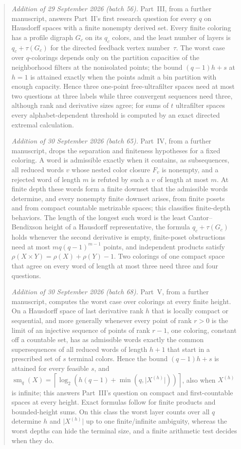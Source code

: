 \documentclass[11pt,letterpaper]{article}
\numberwithin{equation}{section}
\theoremstyle{definition}
\theoremstyle{remark}
\theoremstyle{definition}
\newcommand{\ceil}[1]{\left\lceil#1\right\rceil}
\newcommand{\smq}{\operatorname{sm}_{q}}
\begin{document}
\begin{abstract}
\emph{Addition of 29 September 2026 (batch 56).} Part~III, from a further
manuscript, answers Part~II's first research question for every $q$ on
Hausdorff spaces with a finite nonempty derived set. Every finite coloring
has a profile digraph $G_c$ on its $q_c$ colors, and the least number of
layers is $q_c+\tau(G_c)$ for the directed feedback vertex number~$\tau$. The
worst case over $q$-colorings depends only on the partition capacities of the
neighborhood filters at the nonisolated points; the bound $(q-1)h+s$ at $h=1$
is attained exactly when the points admit a bin partition with enough
capacity. Hence three one-point free-ultrafilter spaces need at most two
questions at three labels while three convergent sequences need three,
although rank and derivative sizes agree; for sums of $t$ ultrafilter spaces
every alphabet-dependent threshold is computed by an exact directed extremal
calculation.

\emph{Addition of 30 September 2026 (batch 65).} Part~IV, from a further
manuscript, drops the separation and finiteness hypotheses for a fixed
coloring. A word is admissible exactly when it contains, as subsequences, all
reduced words $v$ whose nested color closure $F_v$ is nonempty, and a rejected
word of length $m$ is refuted by such a $v$ of length at most $m$. At finite
depth these words form a finite downset that the admissible words determine,
and every nonempty finite downset arises, from finite posets and from compact
countable metrizable spaces; this classifies finite-depth behaviors. The
length of the longest such word is the least Cantor--Bendixson height of a
Hausdorff representative, the formula $q_c+\tau(G_c)$ holds whenever the second
derivative is empty, finite-poset obstructions need at most $mq(q-1)^{m-1}$
points, and independent products satisfy
$\rho(X\times Y)=\rho(X)+\rho(Y)-1$. Two colorings of one compact space that
agree on every word of length at most three need three and four questions.

\emph{Addition of 30 September 2026 (batch 68).} Part~V, from a further
manuscript, computes the worst case over colorings at every finite height.
On a Hausdorff space of last derivative rank $h$ that is locally compact or
sequential, and more generally whenever every point of rank $r>0$ is the
limit of an injective sequence of points of rank $r-1$, one coloring,
constant off a countable set, has as admissible words exactly the common
supersequences of all reduced words of length $h+1$ that start in a
prescribed set of $s$ terminal colors. Hence the bound $(q-1)h+s$ is
attained for every feasible $s$, and
$\smq(X)=\ceil{\log_2(h(q-1)+\min(q,\lvert X^{(h)}\rvert))}$, also when
$X^{(h)}$ is infinite; this answers Part~III's question on compact and
first-countable spaces at every height. Exact formulas follow for finite
products and bounded-height sums. On this class the worst layer counts over
all $q$ determine $h$ and $\lvert X^{(h)}\rvert$ up to one finite/infinite
ambiguity, whereas the worst depths can hide the terminal size, and a
finite arithmetic test decides when they do.
\end{abstract}
\end{document}
